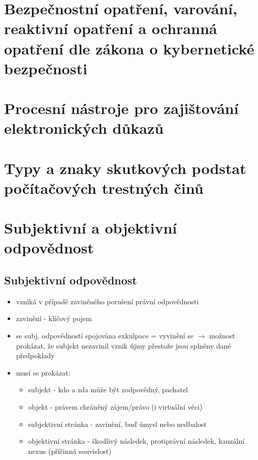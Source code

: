 \clearpage
\section{Bezpečnostní opatření, varování, reaktivní opatření a ochranná opatření dle zákona o kybernetické bezpečnosti}

\clearpage
\section{Procesní nástroje pro zajištování elektronických důkazů}

\clearpage
\section{Typy a znaky skutkových podstat počítačových trestných činů}

\clearpage
\section{Subjektivní a objektivní odpovědnost}
\subsection*{Subjektivní odpovědnost}
\begin{itemize}
    \item vzniká v případě zaviněného porušení právní odpovědnosti
    \item zavinění - klíčový pojem
    \item se subj. odpovědností spojována exkulpace = vyvinění se $\longrightarrow$ možnost prokázat, že subjekt nezavinil vznik újmy přestože jsou splněny dané předpoklady
    \item musí se prokázat:
    \begin{itemize}
        \item subjekt - kdo a zda může být zodpovědný, pachatel
        \item objekt - právem chráněný zájem/právo (i virtuální věci)
        \item subjektivní stránka - zavinění, buď úmysl nebo nedbalost
        \item objektivní stránka - škodlivý následek, protiprávní následek, kauzální nexus (příčinná souvislost)
    \end{itemize}
\end{itemize}

